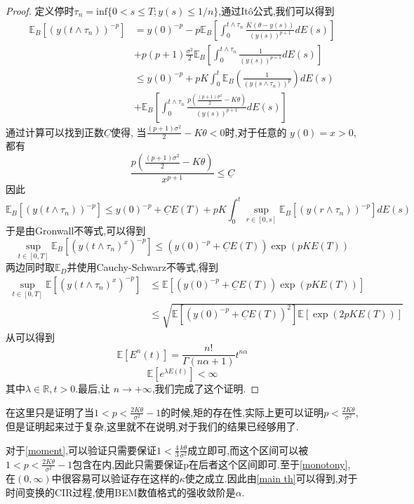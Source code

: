 	\begin{proof}
		定义停时$\tau_{n}=\mathrm{inf}\{0<s\leq T;y(s)\leq1/n\}$,通过It\^{o}公式,我们可以得到
		$$\begin{aligned}
			\mathbb{E}_B\left[(y(t\wedge\tau_{n}))^{-p}\right] &=y(0)^{-p}-p\mathbb{E}_B\left[\int_{0}^{t\wedge\tau_{n}}\frac{K(\theta-y(s))}{(y(s))^{p+1}}dE(s)\right]\\
			&+p(p+1)\frac{\sigma^{2}}{2}\mathbb{E}_B\left[\int_{0}^{t\wedge\tau_{n}}\frac{1}{(y(s))^{p+1}}dE(s)\right] \\
			&\leq y(0)^{-p}+pK\int_{0}^{t}\mathbb{E}_B\left(\frac{1}{(y(s\wedge\tau_{n}))^{p}}
			\right)dE(s) \\
			&+\mathbb{E}_B\left[\int_0^{t\wedge\tau_n}\frac{p\left(\frac{(p+1)\sigma^2}{2}-K\theta\right)}{(y(s))^{p+1}}dE(s)\right]
		\end{aligned}$$
		通过计算可以找到正数$\underline C$使得, 当$\frac{(p+1)\sigma^2}{2}-K\theta<0$时,对于任意的 $y(0)=x>0$,都有
		$$\frac{p\left(\frac{(p+1)\sigma^2}{2}-K\theta\right)}{x^{p+1}}\leq \underline C$$
		因此
		$$\mathbb{E}_B\left[(y(t\wedge\tau_n))^{-p}\right]\leq y(0)^{-p}+\underline{C}E(T)+pK\int_0^t\sup_{r\in[0,s]}\mathbb{E}_B\left[(y(r\wedge\tau_n))^{-p}\right]dE(s)$$
		于是由Gronwall不等式,可以得到
		$$\sup\limits_{t\in[0,T]}\mathbb{E}_B\left[(y(t\wedge\tau_n)^x)^{-p}\right]\leq\left(y(0)^{-p}+\underline{C}E(T)\right)\exp(pKE(T))$$
		两边同时取$\mathbb{E}_D$并使用Cauchy-Schwarz不等式,得到
		$$\begin{aligned}
			\sup\limits_{t\in[0,T]}\mathbb{E}\left[(y(t\wedge\tau_n)^x)^{-p}\right]&\leq\mathbb{E}\left[\left(y(0)^{-p}+\underline{C}E(T)\right)\exp(pKE(T))\right]\\
			&\leq\sqrt{\mathbb{E}\left[\left(y(0)^{-p}+\underline{C}E(T)\right)^2\right]\mathbb{E}\left[\exp(2pKE(T))\right]}
		\end{aligned}$$
		从\cite{jum2014strong}可以得到
		\begin{equation}
			\mathbb{E}[E^n(t)]=\frac{n!}{\Gamma(n\alpha+1)}t^{n\alpha}
		\end{equation}
		\begin{equation}
			\mathbb{E}[e^{\lambda E(t)}]<\infty
		\end{equation}
		其中$\lambda \in \mathbb{R},t>0$.最后,让 $n\to+\infty$,我们完成了这个证明.
	\end{proof}
	\begin{remark}
		在这里只是证明了当$1<p<\frac{2K\theta}{\sigma^2}-1$的时候,矩的存在性,实际上更可以证明$p<\frac{2K\theta}{\sigma^2}$,但是证明起来过于复杂,这里就不在说明,对于我们的结果已经够用了.
	\end{remark}
	对于\cref{moment},可以验证只需要保证$1 < \frac{4}{3}\frac{k\theta}{\sigma^2}$成立即可,而这个区间可以被$1<p<\frac{2K\theta}{\sigma^2}-1$包含在内,因此只需要保证p在后者这个区间即可.至于\cref{monotony},在$(0,\infty)$中很容易可以验证存在这样的$\kappa$使之成立.因此由\cref{main th}可以得到,对于时间变换的CIR过程,使用BEM数值格式的强收敛阶是$\alpha$.
	
